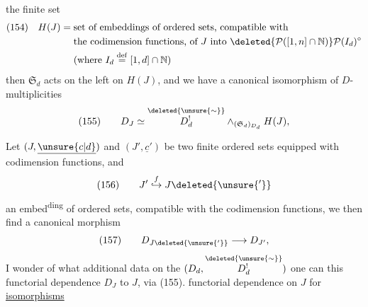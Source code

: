 the finite set
\[
\begin{aligned}
(154)\quad H(J)={}&\text{set of embeddings of ordered sets, compatible with}\\
&\text{the codimension functions, of }J\text{ into }\deleted{\mathcal P([1,n]\cap\mathbb N)}\mathcal P(I_d)^\circ\\
&\text{(where }I_d\overset{\mathrm{def}}=[1,d]\cap\mathbb N\text{)}
\end{aligned}
\]
then $\mathfrak S_d$ acts on the left on $H(J)$, and we have a canonical isomorphism of $D$-multiplicities
\[
(155)\qquad D_J\simeq\overset{\deleted{\unsure{\sim}}}{D^!_d}\mathbin{\wedge}_{(\mathfrak S_d)_{D_d}}H(J),
\]

Let  $(J,\underline{\unsure{c|d}})$ and $(J',\underline{c}')$ be two finite ordered sets equipped with codimension functions, and
\[
(156)\qquad J'\mathrel{\overset{f}{\hookrightarrow}}J\deleted{\unsure{'}}
\]
an embed\textsuperscript{ding} of ordered sets, compatible with the codimension functions, we then find a  canonical morphism
\[
(157)\qquad D_{J\deleted{\unsure{'}}}\longrightarrow D_{J'},
\]
I wonder  of what additional data  on the $(D_d,\overset{\deleted{\unsure{\sim}}}{D^!_d})$ one can  this functorial dependence  $D_J$  to $J$, via (155).   functorial dependence on $J$ for \uline{isomorphisms}
